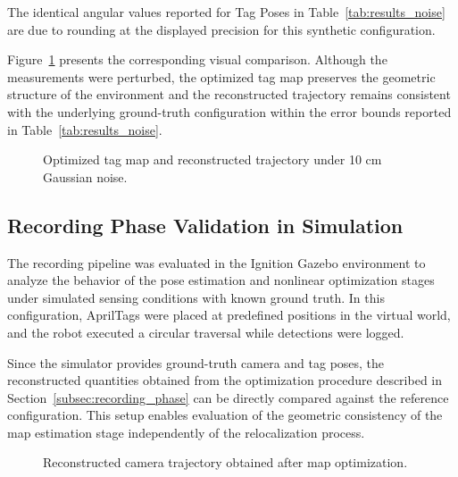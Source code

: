 \documentclass[a4paper,11pt]{article}
\begin{document}
The identical angular values reported for Tag Poses in Table~\ref{tab:results_noise} are due to rounding at the displayed precision for this synthetic configuration.

Figure~\ref{fig:results_noise} presents the corresponding visual comparison. Although the measurements were perturbed, the optimized tag map preserves the geometric structure of the environment and the reconstructed trajectory remains consistent with the underlying ground-truth configuration within the error bounds reported in Table~\ref{tab:results_noise}.

\begin{figure}[h]
	\centering
	
	\caption{Optimized tag map and reconstructed trajectory under 10 cm Gaussian noise.}
	\label{fig:results_noise}
\end{figure}



\subsection{Recording Phase Validation in Simulation}
\label{subsec:simulation_recording}

The recording pipeline was evaluated in the Ignition Gazebo environment to analyze the behavior of the pose estimation and nonlinear optimization stages under simulated sensing conditions with known ground truth. In this configuration, AprilTags were placed at predefined positions in the virtual world, and the robot executed a circular traversal while detections were logged.

Since the simulator provides ground-truth camera and tag poses, the reconstructed quantities obtained from the optimization procedure described in Section~\ref{subsec:recording_phase} can be directly compared against the reference configuration. This setup enables evaluation of the geometric consistency of the map estimation stage independently of the relocalization process.

\begin{figure}[ht]
	\centering
	\begin{minipage}{0.48\linewidth}
		\centering
		
		\caption*{(a) Reconstructed trajectory}
	\end{minipage}
	\hfill
	\begin{minipage}{0.48\linewidth}
		\centering
		
		\caption*{(b) Reconstructed trajectory with local frames}
	\end{minipage}
	\caption{Reconstructed camera trajectory obtained after map optimization.}
	\label{fig:sim_recording_basic}
\end{figure}
\end{document}
